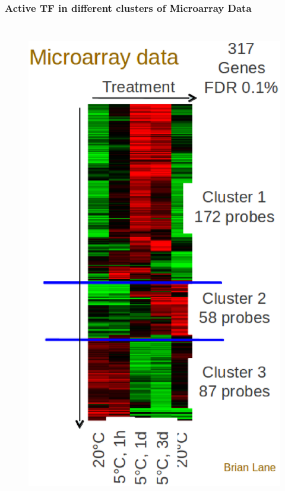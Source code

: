 \documentclass{beamer}
\begin{document}
\begin{frame}
\frametitle{Active TF in different clusters of Microarray Data}
\begin{columns}[c] %

\begin{figure}[!htb]
\centering
\includegraphics[scale=.27]{diagrams/mcd2.eps}
\label{fig:Microarray Data}
\end{figure}


\end{columns}
\end{frame}
\end{document}
